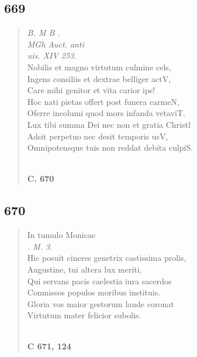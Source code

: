 \documentclass[11pt, a4paper]{report}
\begin{document}
            \subsection*{669}
      \begin{verse}
      \textit{B. M B .} \\ \textit{MGh Auct. anti} \\ \textit{uis. XIV 253.} \\ Nobilis et magno virtutum culmine cels, \\ Ingens consiliis et dextrae belliger actV, \\ Care mihi genitor et vita carior ips! \\ Hoc nati pietas offert post funera carmeN, \\ Oferre incolumi quod mors infanda vetaviT. \\ Lux tibi summa Dei nec non et gratia Christl \\ Adsit perpetuo nec desit temporis usV, \\ Omnipotensque tuis non reddat debita culpiS. \\ 
        ﻿\pagebreak 
     \marginpar{[140]} \begin{center} \textbf{C. 670} \end{center}
      \end{verse}
  
            \subsection*{670}
      \begin{verse}
      In tumulo Monicae \\ \textit{. M. 3.} \\ Hic posuit cineres genetrix castissima prolis, \\ Augustine, tui altera lux meriti, \\ Qui servans pacis caelestia iura sacerdos \\ Conmissos populos moribus instituis. \\ Gloria vos maior gestorum laude coronat \\ Virtutum mater felicior subolis. \\ 
        ﻿\pagebreak 
    \begin{center} \textbf{C 671, 124} \end{center} \marginpar{[141]} 
      \end{verse}
  
\end{document}
